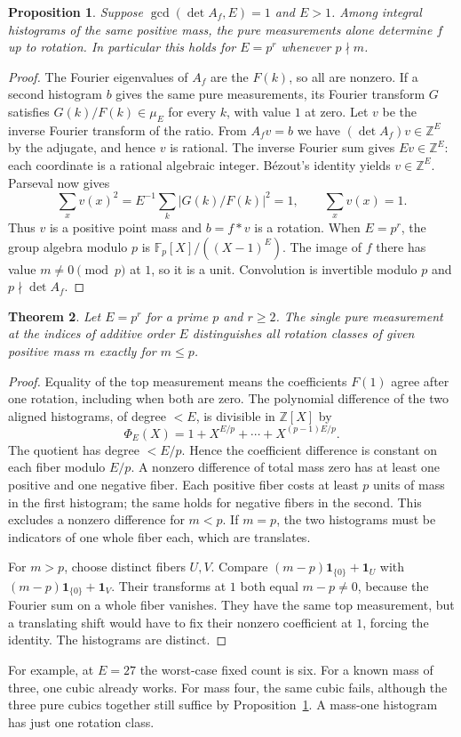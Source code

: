 \documentclass[11pt,letterpaper]{article}
\newtheorem{theorem}{Theorem}\newtheorem{lemma}[theorem]{Lemma}\newtheorem{corollary}[theorem]{Corollary}\newtheorem{proposition}[theorem]{Proposition}
\newcommand{\Z}{\mathbb Z}\newcommand{\Q}{\mathbb Q}\newcommand{\C}{\mathbb C}
\begin{document}
\begin{proposition}\label{prop:unit}
Suppose $\gcd(\det A_f,E)=1$ and $E>1$. Among integral histograms of the same positive mass, the pure measurements alone determine $f$ up to rotation. In particular this holds for $E=p^r$ whenever $p\nmid m$.
\end{proposition}
\begin{proof}
The Fourier eigenvalues of $A_f$ are the $F(k)$, so all are nonzero. If a second histogram $b$ gives the same pure measurements, its Fourier transform $G$ satisfies $G(k)/F(k)\in\mu_E$ for every $k$, with value $1$ at zero. Let $v$ be the inverse Fourier transform of the ratio. From $A_fv=b$ we have $(\det A_f)v\in\Z^E$ by the adjugate, and hence $v$ is rational. The inverse Fourier sum gives $Ev\in\Z^E$: each coordinate is a rational algebraic integer. B\'ezout's identity yields $v\in\Z^E$. Parseval now gives
\[
       \sum_x v(x)^2=E^{-1}\sum_k |G(k)/F(k)|^2=1,
       \qquad \sum_x v(x)=1.
\]
Thus $v$ is a positive point mass and $b=f*v$ is a rotation. When $E=p^r$, the group algebra modulo $p$ is $\mathbb F_p[X]/((X-1)^E)$. The image of $f$ there has value $m\ne0\pmod p$ at $1$, so it is a unit. Convolution is invertible modulo $p$ and $p\nmid\det A_f$.
\end{proof}

\begin{theorem}\label{th:small}
Let $E=p^r$ for a prime $p$ and $r\ge2$. The single pure measurement at the indices of additive order $E$ distinguishes all rotation classes of given positive mass $m$ exactly for $m\le p$.
\end{theorem}
\begin{proof}
Equality of the top measurement means the coefficients $F(1)$ agree after one rotation, including when both are zero. The polynomial difference of the two aligned histograms, of degree $<E$, is divisible in $\Z[X]$ by
\[
       \Phi_E(X)=1+X^{E/p}+\cdots+X^{(p-1)E/p}.
\]
The quotient has degree $<E/p$. Hence the coefficient difference is constant on each fiber modulo $E/p$. A nonzero difference of total mass zero has at least one positive and one negative fiber. Each positive fiber costs at least $p$ units of mass in the first histogram; the same holds for negative fibers in the second. This excludes a nonzero difference for $m<p$. If $m=p$, the two histograms must be indicators of one whole fiber each, which are translates.

For $m>p$, choose distinct fibers $U,V$. Compare $(m-p)\mathbf1_{\{0\}}+\mathbf1_U$ with $(m-p)\mathbf1_{\{0\}}+\mathbf1_V$. Their transforms at $1$ both equal $m-p\ne0$, because the Fourier sum on a whole fiber vanishes. They have the same top measurement, but a translating shift would have to fix their nonzero coefficient at $1$, forcing the identity. The histograms are distinct.
\end{proof}
For example, at $E=27$ the worst-case fixed count is six. For a known mass of three, one cubic already works. For mass four, the same cubic fails, although the three pure cubics together still suffice by Proposition~\ref{prop:unit}. A mass-one histogram has just one rotation class.
\end{document}
